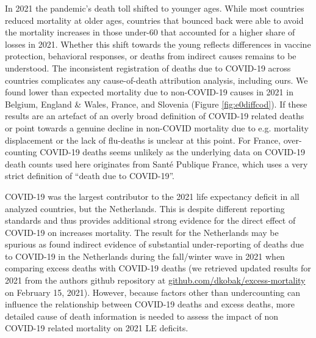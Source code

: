 \documentclass[12pt]{article}
\begin{document}
In 2021 the pandemic's death toll shifted to younger ages. While most countries reduced mortality at older ages, countries that bounced back were able to  avoid the mortality increases in those under-60 that accounted for a higher share of losses in 2021. Whether this shift towards the young reflects differences in vaccine protection, behavioral responses, or deaths from indirect causes remains to be understood. The inconsistent registration of deaths due to COVID-19 across countries\citealp{Garcia2021} complicates any cause-of-death attribution analysis, including ours. We found lower than expected mortality due to non-COVID-19 causes in 2021 in Belgium, England \& Wales, France, and Slovenia (Figure \ref{fig:e0diffcod}). If these results are an artefact of an overly broad definition of COVID-19 related deaths or point towards a genuine decline in non-COVID mortality due to e.g. mortality displacement or the lack of flu-deaths is unclear at this point. For France, over-counting COVID-19 deaths seems unlikely as the underlying data on COVID-19 death counts used here originates from Santé Publique France,
which uses a very strict definition of ``death due to COVID-19''.\citealp{Garcia2021}

COVID-19 was the largest contributor to the 2021 life expectancy deficit in all analyzed countries, but the Netherlands. This is despite different reporting standards and thus provides additional strong evidence for the direct effect of COVID-19 on increases mortality. The result for the Netherlands may be spurious as \citeauthor{Karlinsky2021}\citealp{Karlinsky2021} found indirect evidence of substantial under-reporting of deaths due to COVID-19 in the Netherlands during the fall/winter wave in 2021 when comparing excess deaths with COVID-19 deaths (we retrieved updated results for 2021 from the authors github repository at \href{https://github.com/dkobak/excess-mortality}{github.com/dkobak/excess-mortality} on February 15, 2021). However, because factors other than undercounting can influence the relationship between COVID-19 deaths and excess deaths, more detailed cause of death information is needed to assess the impact of non COVID-19 related mortality on 2021 LE deficits.
\end{document}
